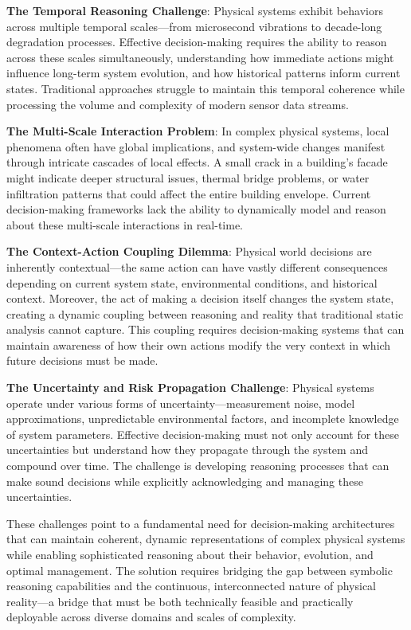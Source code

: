 \textbf{The Temporal Reasoning Challenge}: Physical systems exhibit behaviors across multiple temporal scales—from microsecond vibrations to decade-long degradation processes. Effective decision-making requires the ability to reason across these scales simultaneously, understanding how immediate actions might influence long-term system evolution, and how historical patterns inform current states. Traditional approaches struggle to maintain this temporal coherence while processing the volume and complexity of modern sensor data streams.

\textbf{The Multi-Scale Interaction Problem}: In complex physical systems, local phenomena often have global implications, and system-wide changes manifest through intricate cascades of local effects. A small crack in a building's facade might indicate deeper structural issues, thermal bridge problems, or water infiltration patterns that could affect the entire building envelope. Current decision-making frameworks lack the ability to dynamically model and reason about these multi-scale interactions in real-time.

\textbf{The Context-Action Coupling Dilemma}: Physical world decisions are inherently contextual—the same action can have vastly different consequences depending on current system state, environmental conditions, and historical context. Moreover, the act of making a decision itself changes the system state, creating a dynamic coupling between reasoning and reality that traditional static analysis cannot capture. This coupling requires decision-making systems that can maintain awareness of how their own actions modify the very context in which future decisions must be made.

\textbf{The Uncertainty and Risk Propagation Challenge}: Physical systems operate under various forms of uncertainty—measurement noise, model approximations, unpredictable environmental factors, and incomplete knowledge of system parameters. Effective decision-making must not only account for these uncertainties but understand how they propagate through the system and compound over time. The challenge is developing reasoning processes that can make sound decisions while explicitly acknowledging and managing these uncertainties.

These challenges point to a fundamental need for decision-making architectures that can maintain coherent, dynamic representations of complex physical systems while enabling sophisticated reasoning about their behavior, evolution, and optimal management. The solution requires bridging the gap between symbolic reasoning capabilities and the continuous, interconnected nature of physical reality—a bridge that must be both technically feasible and practically deployable across diverse domains and scales of complexity.

